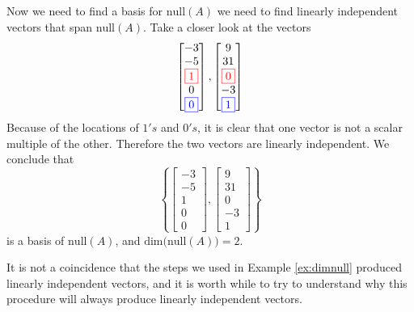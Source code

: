 \documentclass{ximera}
\begin{document}
\begin{example}
\begin{explanation}
Now we need to find a basis for $\mbox{null}(A)$ we need to find linearly independent vectors that span $\mbox{null}(A)$.  Take a closer look at the vectors
$$\begin{bmatrix}-3\\-5\\{\color{red}\fbox{$1$}}\\0\\{\color{blue}\fbox{$0$}}\end{bmatrix}, \begin{bmatrix}9\\31\\{\color{red}\fbox{$0$}}\\-3\\{\color{blue}\fbox{$1$}}\end{bmatrix}$$
Because of the locations of $1's$ and $0's$, it is clear that one vector is not a scalar multiple of the other.  Therefore the two vectors are linearly independent.  We conclude that 
$$\left\{\begin{bmatrix}-3\\-5\\1\\0\\0\end{bmatrix}, \begin{bmatrix}9\\31\\0\\-3\\1\end{bmatrix}\right\}$$
is a basis of $\mbox{null}(A)$, and $\mbox{dim}\Big(\mbox{null}(A)\Big)=2$.
\end{explanation}
\end{example}
It is not a coincidence that the steps we used in Example \ref{ex:dimnull} produced linearly independent vectors, and it is worth while to try to understand why this procedure will always produce linearly independent vectors.
\end{document}
